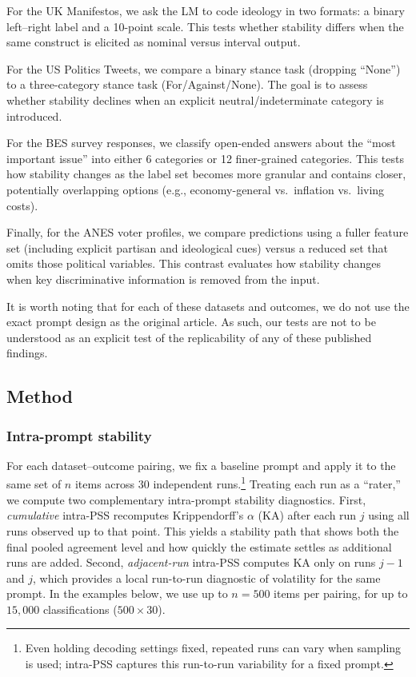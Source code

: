 \documentclass{article}
\begin{document}
For the UK Manifestos, we ask the LM to code ideology in two formats: a binary left--right label and a 10-point scale. This tests whether stability differs when the same construct is elicited as nominal versus interval output.

For the US Politics Tweets, we compare a binary stance task (dropping ``None'') to a three-category stance task (For/Against/None). The goal is to assess whether stability declines when an explicit neutral/indeterminate category is introduced.

For the BES survey responses, we classify open-ended answers about the ``most important issue'' into either 6 categories or 12 finer-grained categories. This tests how stability changes as the label set becomes more granular and contains closer, potentially overlapping options (e.g., economy-general vs.\ inflation vs.\ living costs).

Finally, for the ANES voter profiles, we compare predictions using a fuller feature set (including explicit partisan and ideological cues) versus a reduced set that omits those political variables. This contrast evaluates how stability changes when key discriminative information is removed from the input.

It is worth noting that for each of these datasets and outcomes, we do not use the exact prompt design as the original article. As such, our tests are not to be understood as an explicit test of the replicability of any of these published findings. 

\subsection{Method}

\subsubsection{Intra-prompt stability}

For each dataset--outcome pairing, we fix a baseline prompt and apply it to the same set of $n$ items across $30$ independent runs.\footnote{Even holding decoding settings fixed, repeated runs can vary when sampling is used; intra-PSS captures this run-to-run variability for a fixed prompt.} Treating each run as a ``rater,'' we compute two complementary intra-prompt stability diagnostics. First, \emph{cumulative} intra-PSS recomputes Krippendorff's $\alpha$ (KA) after each run $j$ using all runs observed up to that point. This yields a stability path that shows both the final pooled agreement level and how quickly the estimate settles as additional runs are added. Second, \emph{adjacent-run} intra-PSS computes KA only on runs $j-1$ and $j$, which provides a local run-to-run diagnostic of volatility for the same prompt. In the examples below, we use up to $n=500$ items per pairing, for up to $15{,}000$ classifications ($500 \times 30$).
\end{document}
